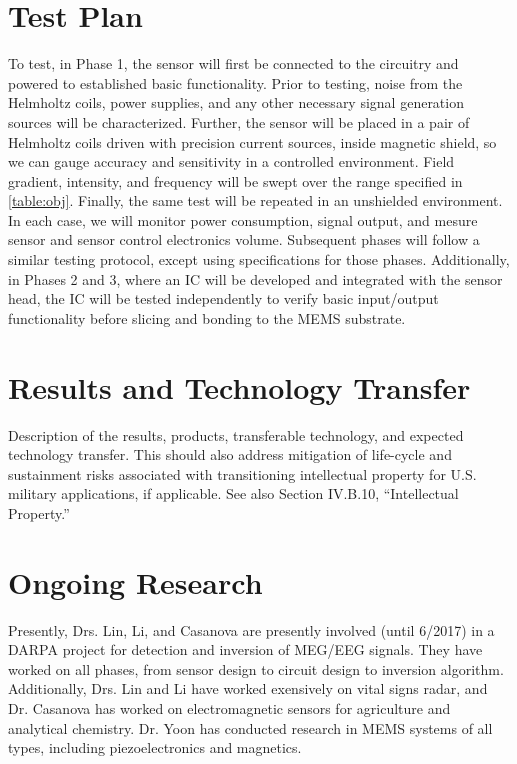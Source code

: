 \section{Test Plan}

To test, in Phase 1, the sensor will first be connected to the circuitry and powered to established basic functionality.  Prior to testing, noise from the Helmholtz coils, power supplies, and any other necessary signal generation sources will be characterized. Further, the sensor will be placed in a pair of Helmholtz coils driven with precision current sources, inside magnetic shield, so we can gauge accuracy and sensitivity in a controlled environment. Field gradient, intensity, and frequency will be swept over the range specified in \ref{table:obj}. Finally, the same test will be repeated in an unshielded environment. In each case, we will monitor power consumption, signal output, and mesure sensor and sensor control electronics volume. Subsequent phases will follow a similar testing protocol, except using specifications for those phases. Additionally, in Phases 2 and 3, where an IC will be developed and integrated with the sensor head, the IC will be tested independently to verify basic input/output functionality before slicing and bonding to the MEMS substrate.

\section{Results and Technology Transfer}
Description of the results, products, transferable technology, and expected technology
transfer. This should also address mitigation of life-cycle and sustainment risks associated
with transitioning intellectual property for U.S. military applications, if applicable. See also
Section IV.B.10, “Intellectual Property.”

\section{Ongoing Research}
Presently, Drs. Lin, Li, and Casanova are presently involved (until 6/2017) in a DARPA project for detection and inversion of MEG/EEG signals. They have worked on all phases, from sensor design to circuit design to inversion algorithm. Additionally, Drs. Lin and Li have worked exensively on vital signs radar, and Dr. Casanova has worked on electromagnetic sensors for agriculture and analytical chemistry. Dr. Yoon has conducted research in MEMS systems of all types, including piezoelectronics and magnetics. 

